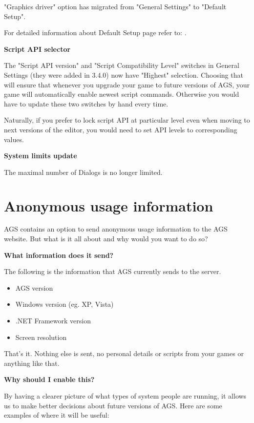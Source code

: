 "Graphics driver" option has migrated from "General Settings" to "Default Setup".

For detailed information about Default Setup page refer to: .

\bf{Script API selector}

The "Script API version" and "Script Compatibility Level" switches in General Settings (they were added in 3.4.0) now have "Highest" selection. Choosing that will ensure that whenever you upgrade your game to future versions of AGS, your game will automatically enable newest script commands. Otherwise you would have to update these two switches by hand every time.

Naturally, if you prefer to lock script API at particular level even when moving to next versions of the editor, you would need to set API levels to corresponding values.

\bf{System limits update}

The maximal number of Dialogs is no longer limited.



\chapter{Anonymous usage information}\label{AnonymousUsageInfo}%

AGS contains an option to send anonymous usage information to the AGS website.
But what is it all about and why would you want to do so?

\bf{What information does it send?}

The following is the information that AGS currently sends to the server.

\begin{itemize}\itemsep=0pt
\item AGS version
\item Windows version (eg. XP, Vista)
\item .NET Framework version
\item Screen resolution
\end{itemize}

That's it. Nothing else is sent, no personal details or scripts from your games
or anything like that.

\bf{Why should I enable this?}

By having a clearer picture of what types of system people are running, it
allows us to make better decisions about future versions of AGS. Here are some
examples of where it will be useful:

